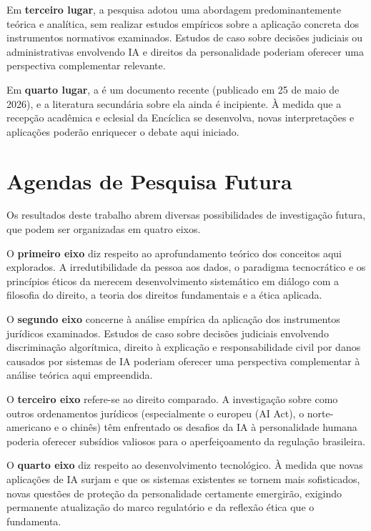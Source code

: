 Em \textbf{terceiro lugar}, a pesquisa adotou uma abordagem predominantemente teórica e analítica, sem realizar estudos empíricos sobre a aplicação concreta dos instrumentos normativos examinados. Estudos de caso sobre decisões judiciais ou administrativas envolvendo IA e direitos da personalidade poderiam oferecer uma perspectiva complementar relevante.

Em \textbf{quarto lugar}, a \MH{} é um documento recente (publicado em 25 de maio de 2026), e a literatura secundária sobre ela ainda é incipiente. À medida que a recepção acadêmica e eclesial da Encíclica se desenvolva, novas interpretações e aplicações poderão enriquecer o debate aqui iniciado.

\section{Agendas de Pesquisa Futura}
\label{sec:agendas-futuras}

Os resultados deste trabalho abrem diversas possibilidades de investigação futura, que podem ser organizadas em quatro eixos.

O \textbf{primeiro eixo} diz respeito ao aprofundamento teórico dos conceitos aqui explorados. A irredutibilidade da pessoa aos dados, o paradigma tecnocrático e os princípios éticos da \MH{} merecem desenvolvimento sistemático em diálogo com a filosofia do direito, a teoria dos direitos fundamentais e a ética aplicada.

O \textbf{segundo eixo} concerne à análise empírica da aplicação dos instrumentos jurídicos examinados. Estudos de caso sobre decisões judiciais envolvendo discriminação algorítmica, direito à explicação e responsabilidade civil por danos causados por sistemas de IA poderiam oferecer uma perspectiva complementar à análise teórica aqui empreendida.

O \textbf{terceiro eixo} refere-se ao direito comparado. A investigação sobre como outros ordenamentos jurídicos (especialmente o europeu (AI Act), o norte-americano e o chinês) têm enfrentado os desafios da IA à personalidade humana poderia oferecer subsídios valiosos para o aperfeiçoamento da regulação brasileira.

O \textbf{quarto eixo} diz respeito ao desenvolvimento tecnológico. À medida que novas aplicações de IA surjam e que os sistemas existentes se tornem mais sofisticados, novas questões de proteção da personalidade certamente emergirão, exigindo permanente atualização do marco regulatório e da reflexão ética que o fundamenta.

